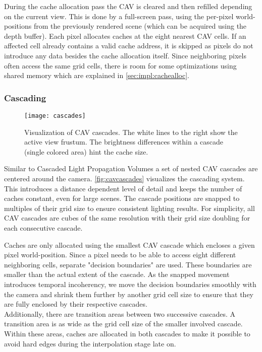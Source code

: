 \documentclass[thesis.tex]{subfiles}
\begin{document}
During the cache allocation pass the CAV is cleared and then refilled depending on the current view.
This is done by a full-screen pass, using the per-pixel world-positions from the previously rendered scene (which can be acquired using the depth buffer).
Each pixel allocates caches at the eight nearest CAV cells.
If an affected cell already contains a valid cache address, it is skipped as pixels do not introduce any data besides the cache allocation itself.
Since neighboring pixels often access the same grid cells, there is room for some optimizations using shared memory which are explained in \autoref{sec:impl:cachealloc}.

\subsubsection{Cascading}
\begin{figure}[h]
	\centering
	\texttt{[image: cascades]}
	\caption{Visualization of CAV cascades. The white lines to the right show the active view frustum. The brightness differences within a cascade (single colored area) hint the cache size.} \label{fig:cavcascades}
\end{figure}

Similar to Cascaded Light Propagation Volumes \cite{bib:lpt} a set of nested CAV cascades are centered around the camera.
\autoref{fig:cavcascades} visualizes the cascading system.
This introduces a distance dependent level of detail and keeps the number of caches constant, even for large scenes.
The cascade positions are snapped to multiples of their grid size to ensure consistent lighting results. 
For simplicity, all CAV cascades are cubes of the same resolution with their grid size doubling for each consecutive cascade.

Caches are only allocated using the smallest CAV cascade which encloses a given pixel world-position.
Since a pixel needs to be able to access eight different neighboring cells, separate "decision boundaries" are used.
These boundaries are smaller than the actual extent of the cascade.
As the snapped movement introduces temporal incoherency, we move the decision boundaries smoothly with the camera and shrink them further by another grid cell size to ensure that they are fully enclosed by their respective cascades.\\
Additionally, there are transition areas between two successive cascades.
A transition area is as wide as the grid cell size of the smaller involved cascade. 
Within these areas, caches are allocated in both cascades to make it possible to avoid hard edges during the interpolation stage late on.
\end{document}
